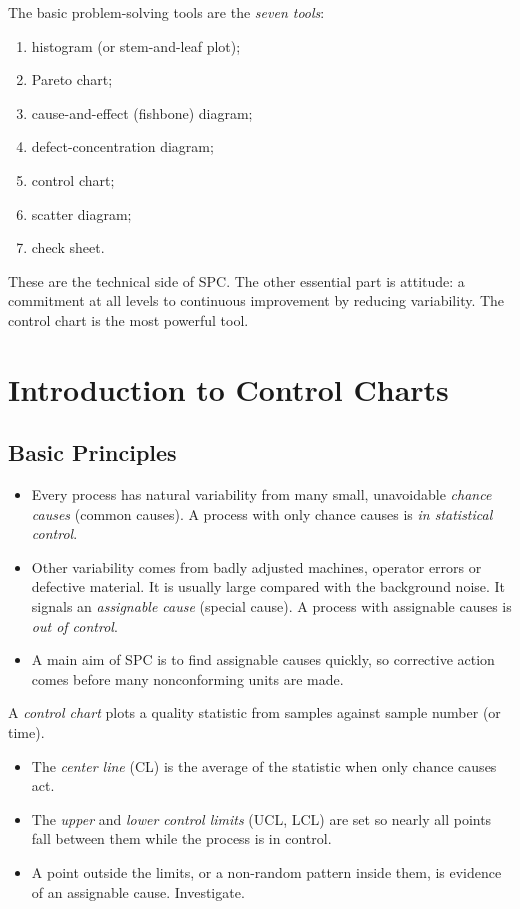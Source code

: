 The basic problem-solving tools are the \emph{seven tools}:
\begin{enumerate}[label=(\arabic*)]
  \item histogram (or stem-and-leaf plot);
  \item Pareto chart;
  \item cause-and-effect (fishbone) diagram;
  \item defect-concentration diagram;
  \item control chart;
  \item scatter diagram;
  \item check sheet.
\end{enumerate}
These are the technical side of SPC. The other essential part is attitude: a commitment at all levels to continuous improvement by reducing variability. The control chart is the most powerful tool.

\section{Introduction to Control Charts}

\subsection{Basic Principles}

\begin{itemize}
  \item Every process has natural variability from many small, unavoidable \emph{chance causes} (common causes). A process with only chance causes is \emph{in statistical control}.
  \item Other variability comes from badly adjusted machines, operator errors or defective material. It is usually large compared with the background noise. It signals an \emph{assignable cause} (special cause). A process with assignable causes is \emph{out of control}.
  \item A main aim of SPC is to find assignable causes quickly, so corrective action comes before many nonconforming units are made.
\end{itemize}

A \emph{control chart} plots a quality statistic from samples against sample number (or time).
\begin{itemize}
  \item The \emph{center line} (CL) is the average of the statistic when only chance causes act.
  \item The \emph{upper} and \emph{lower control limits} (UCL, LCL) are set so nearly all points fall between them while the process is in control.
  \item A point outside the limits, or a non-random pattern inside them, is evidence of an assignable cause. Investigate.
\end{itemize}


